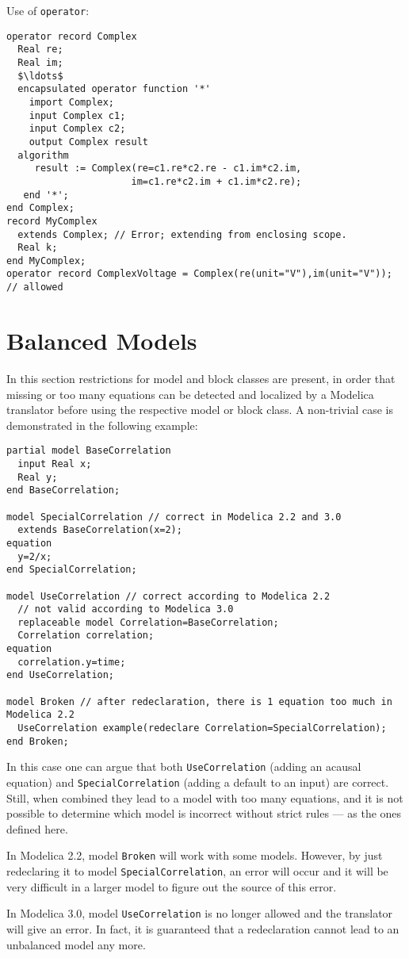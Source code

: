 \begin{example}
Use of \lstinline!operator!:
\begin{lstlisting}[language=modelica]
operator record Complex
  Real re;
  Real im;
  $\ldots$
  encapsulated operator function '*'
    import Complex;
    input Complex c1;
    input Complex c2;
    output Complex result
  algorithm
     result := Complex(re=c1.re*c2.re - c1.im*c2.im,
                      im=c1.re*c2.im + c1.im*c2.re);
   end '*';
end Complex;
record MyComplex
  extends Complex; // Error; extending from enclosing scope.
  Real k;
end MyComplex;
operator record ComplexVoltage = Complex(re(unit="V"),im(unit="V")); // allowed
\end{lstlisting}
\end{example}

\section{Balanced Models}\label{balanced-models}

\begin{nonnormative}
In this section restrictions for model and block classes are
present, in order that missing or too many equations can be detected and
localized by a Modelica translator before using the respective model or
block class. A non-trivial case is demonstrated in the following
example:
\begin{lstlisting}[language=modelica]
partial model BaseCorrelation
  input Real x;
  Real y;
end BaseCorrelation;

model SpecialCorrelation // correct in Modelica 2.2 and 3.0
  extends BaseCorrelation(x=2);
equation
  y=2/x;
end SpecialCorrelation;

model UseCorrelation // correct according to Modelica 2.2
  // not valid according to Modelica 3.0
  replaceable model Correlation=BaseCorrelation;
  Correlation correlation;
equation
  correlation.y=time;
end UseCorrelation;

model Broken // after redeclaration, there is 1 equation too much in Modelica 2.2
  UseCorrelation example(redeclare Correlation=SpecialCorrelation);
end Broken;
\end{lstlisting}

In this case one can argue that both \lstinline!UseCorrelation! (adding an acausal equation) and \lstinline!SpecialCorrelation! (adding a default to an input) are correct.  Still, when combined they
lead to a model with too many equations, and it is not possible to determine which model is incorrect without strict rules --- as the ones defined here.

In Modelica 2.2, model \lstinline!Broken! will work with some models.
However, by just redeclaring it to model \lstinline!SpecialCorrelation!, an
error will occur and it will be very difficult in a larger model to
figure out the source of this error.

In Modelica 3.0, model \lstinline!UseCorrelation! is no longer allowed
and the translator will give an error. In fact, it is guaranteed that a
redeclaration cannot lead to an unbalanced model any more.
\end{nonnormative}

